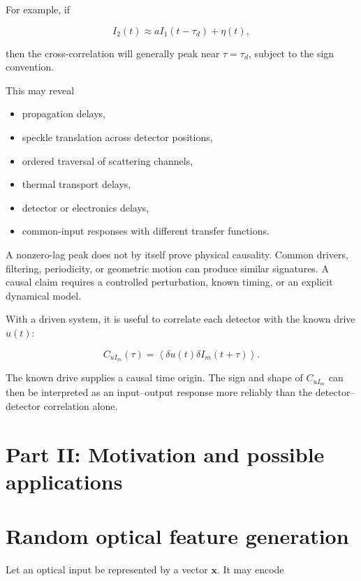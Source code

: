 \documentclass[11pt,letterpaper]{article}
\newcommand{\avg}[1]{\left\langle #1 \right\rangle}
\begin{document}
For example, if

\begin{equation}
    I_2(t)\approx aI_1(t-\tau_d)+\eta(t),
\end{equation}

then the cross-correlation will generally peak near $\tau=\tau_d$, subject
to the sign convention.

This may reveal

\begin{itemize}[leftmargin=2em]
    \item propagation delays,
    \item speckle translation across detector positions,
    \item ordered traversal of scattering channels,
    \item thermal transport delays,
    \item detector or electronics delays,
    \item common-input responses with different transfer functions.
\end{itemize}

A nonzero-lag peak does not by itself prove physical causality. Common
drivers, filtering, periodicity, or geometric motion can produce similar
signatures. A causal claim requires a controlled perturbation, known timing,
or an explicit dynamical model.

With a driven system, it is useful to correlate each detector with the
known drive $u(t)$:

\begin{equation}
    C_{uI_m}(\tau)
    =
    \avg{
    \delta u(t)
    \delta I_m(t+\tau)
    }.
    \label{eq:input_output_cross}
\end{equation}

The known drive supplies a causal time origin. The sign and shape of
$C_{uI_m}$ can then be interpreted as an input--output response more
reliably than the detector--detector correlation alone.

\section{Part II: Motivation and possible applications}

\section{Random optical feature generation}

Let an optical input be represented by a vector $\bm{x}$. It may encode
\end{document}
